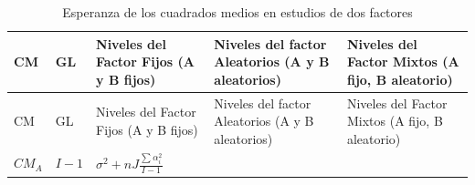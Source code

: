 \documentclass[]{book}
\theoremstyle{definition}
\theoremstyle{definition}
\theoremstyle{definition}
\theoremstyle{remark}
\begin{document}
\begin{longtable}[]{@{}lllll@{}}
\caption{\label{tab:esperanza-CM} Esperanza de los cuadrados medios en
estudios de dos factores}\tabularnewline
\toprule
\begin{minipage}[b]{0.15\columnwidth}\raggedright
CM\strut
\end{minipage} & \begin{minipage}[b]{0.04\columnwidth}\raggedright
GL\strut
\end{minipage} & \begin{minipage}[b]{0.30\columnwidth}\raggedright
Niveles del Factor Fijos (A y B fijos)\strut
\end{minipage} & \begin{minipage}[b]{0.16\columnwidth}\raggedright
Niveles del factor Aleatorios (A y B aleatorios)\strut
\end{minipage} & \begin{minipage}[b]{0.22\columnwidth}\raggedright
Niveles del Factor Mixtos (A fijo, B aleatorio)\strut
\end{minipage}\tabularnewline
\midrule
\endfirsthead
\toprule
\begin{minipage}[b]{0.15\columnwidth}\raggedright
CM\strut
\end{minipage} & \begin{minipage}[b]{0.04\columnwidth}\raggedright
GL\strut
\end{minipage} & \begin{minipage}[b]{0.30\columnwidth}\raggedright
Niveles del Factor Fijos (A y B fijos)\strut
\end{minipage} & \begin{minipage}[b]{0.16\columnwidth}\raggedright
Niveles del factor Aleatorios (A y B aleatorios)\strut
\end{minipage} & \begin{minipage}[b]{0.22\columnwidth}\raggedright
Niveles del Factor Mixtos (A fijo, B aleatorio)\strut
\end{minipage}\tabularnewline
\midrule
\endhead
\begin{minipage}[t]{0.15\columnwidth}\raggedright
\(CM_{A}\)\strut
\end{minipage} & \begin{minipage}[t]{0.04\columnwidth}\raggedright
\(I - 1\)\strut
\end{minipage} & \begin{minipage}[t]{0.30\columnwidth}\raggedright
\(\sigma^{2} + nJ\frac{\sum_{}^{}\alpha_{i}^{2}}{I - 1}\)\strut
\end{minipage} & \begin{minipage}[t]{0.16\columnwidth}\raggedright

\end{minipage}
\end{longtable}
\end{document}
